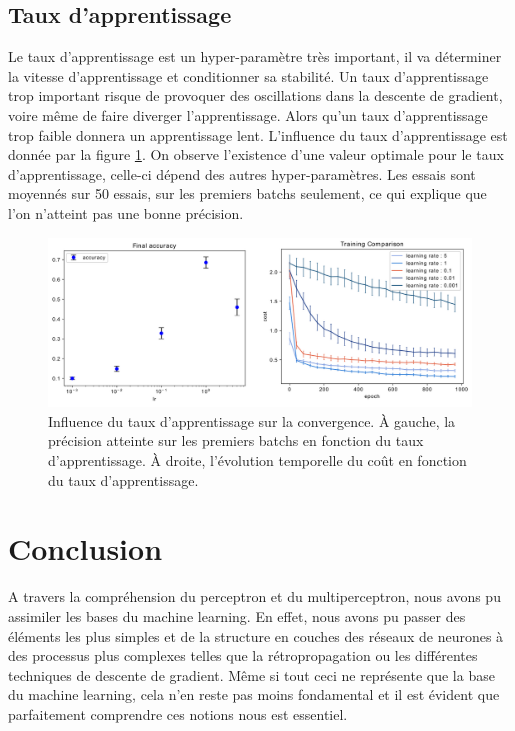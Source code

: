 \subsection{Taux d'apprentissage}
Le taux d'apprentissage est un hyper-paramètre très important, il va déterminer la vitesse d'apprentissage et conditionner sa stabilité. Un taux d'apprentissage trop important risque de provoquer des oscillations dans la descente de gradient, voire même de faire diverger l'apprentissage. Alors qu'un taux d'apprentissage trop faible donnera un apprentissage lent. L'influence du taux d'apprentissage est donnée par la figure \ref{taux_app}. On observe l'existence d'une valeur optimale pour le taux d'apprentissage, celle-ci dépend des autres hyper-paramètres. Les essais sont moyennés sur 50 essais, sur les premiers batchs seulement, ce qui explique que l'on n'atteint pas une bonne précision.

\begin{figure}[!h]
\centering
\includegraphics[width=320pt]{"images/MLP/taux_app"}
\caption{Influence du taux d'apprentissage sur la convergence. À gauche, la précision atteinte sur les premiers batchs en fonction du taux d'apprentissage. À droite, l'évolution temporelle du coût en fonction du taux d'apprentissage.}
\label{taux_app}
\end{figure}

\section{Conclusion}

A travers la compréhension du perceptron et du multiperceptron, nous avons pu assimiler les bases du machine learning. En effet, nous avons pu passer des éléments les plus simples et de la structure en couches des réseaux de neurones à des processus plus complexes telles que la rétropropagation ou les différentes techniques de descente de gradient. Même si tout ceci ne représente que la base du machine learning, cela n'en reste pas moins fondamental et il est évident que parfaitement comprendre ces notions nous est essentiel. 
